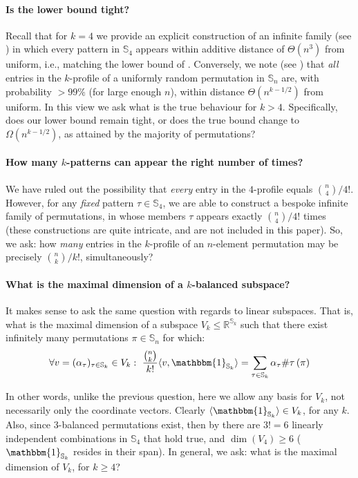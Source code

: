 \documentclass{article}
\newcommand{\Sn}{\mathbb{S}_n}
\newcommand{\RR}{\mathbb{R}}
\newcommand{\pc}[2]{{\# \mathtt{ #1 } \left( #2 \right)}}
\theoremstyle{remark}
\theoremstyle{plain}
\begin{document}
\paragraph{Is the lower bound tight?} 
Recall that for $k=4$ we provide an explicit construction of an infinite family (see )
in which every pattern in $\mathbb{S}_4$ appears within additive distance of $\Theta(n^{3})$ from uniform, i.e., matching the lower bound of .
Conversely, we note (see ) that \textit{all} entries in the $k$-profile of a uniformly random permutation in $\mathbb{S}_n$ 
are, with probability $>99\%$ (for large enough $n$), within distance $\Theta(n^{k - 1/2})$ from uniform. In this view we ask
what is the true behaviour for $k>4$. Specifically,
does our lower bound remain tight, or does the true bound change to $\Omega(n^{k-1/2})$, as attained by the majority of permutations?

\paragraph{How many $k$-patterns can appear the right number of times?}
We have ruled out the possibility
that \textit{every} entry in the $4$-profile equals $\binom{n}{4}/4!$.
However, for any \textit{fixed} pattern $\tau \in \mathbb{S}_4$, we are able
to construct a bespoke infinite family of permutations, in whose members $\tau$ appears exactly $\binom{n}{4}/4!$ times
(these constructions are quite intricate, and are not included in this paper).
So, we ask: how \textit{many} entries in the $k$-profile of an $n$-element permutation may be precisely $\binom{n}{k}/k!$, simultaneously? 

\paragraph{What is the maximal dimension of a $k$-balanced subspace?} 
It makes sense to ask the same question with regards to linear subspaces.
That is, what is the maximal dimension of a subspace $V_k \le \RR^{\mathbb{S}_k}$ such that there exist infinitely many permutations $\pi \in \Sn$ for which:
\[
    \forall v = (\alpha_{\tau})_{\tau \in \mathbb{S}_k} \in V_k:\ \frac{\binom{n}{k}}{k!} \langle v, \mathbbm{1}_{\mathbb{S}_k} \rangle = \sum_{\tau \in \mathbb{S}_k} \alpha_\tau \pc{\tau}{\pi}
\]

In other words, unlike the previous question, here we allow any basis for $V_k$, not necessarily only the coordinate vectors.
Clearly $\langle \mathbbm{1}_{\mathbb{S}_k} \rangle \in V_k$, for any $k$. Also, since $3$-balanced permutations exist, then by  there
are $3!=6$ linearly independent combinations in $\mathbb{S}_4$ that hold true, and $\dim(V_4) \ge 6$ ($\mathbbm{1}_{\mathbb{S}_k}$ resides in their span). In general, we ask: what is the maximal dimension of $V_k$, for $k \ge 4$?
\end{document}
